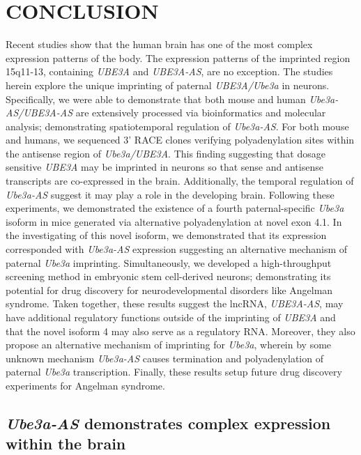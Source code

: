 
\chapter{\uppercase {Conclusion}}

Recent studies show that the human brain has one of the most complex expression patterns of the body. The expression patterns of the imprinted region 15q11-13, containing \textit{UBE3A} and \textit{UBE3A-AS}, are no exception. The studies herein explore the unique imprinting of paternal \textit{UBE3A/Ube3a} in neurons. Specifically, we were able to demonstrate that both mouse and human \textit{Ube3a-AS/UBE3A-AS} are extensively processed via bioinformatics and molecular analysis; demonstrating spatiotemporal regulation of \textit{Ube3a-AS}. For both mouse and humans, we sequenced 3' RACE clones verifying polyadenylation sites within the antisense region of \textit{Ube3a/UBE3A}. This finding suggesting that dosage sensitive \textit{UBE3A} may be imprinted in neurons so that sense and antisense transcripts are co-expressed in the brain. Additionally, the temporal regulation of \textit{Ube3a-AS} suggest it may play a role in the developing brain. Following these experiments, we demonstrated the existence of a fourth paternal-specific \textit{Ube3a} isoform in mice generated via alternative polyadenylation at novel exon 4.1. In the investigating of this novel isoform, we demonstrated that its expression corresponded with \textit{Ube3a-AS} expression suggesting an alternative mechanism of paternal \textit{Ube3a} imprinting. Simultaneously, we developed a high-throughput screening method in embryonic stem cell-derived neurons; demonstrating its potential for drug discovery for neurodevelopmental disorders like Angelman syndrome. Taken together, these results suggest the lncRNA, \textit{UBE3A-AS}, may have additional regulatory functions outside of the imprinting of \textit{UBE3A} and that the novel isoform 4 may also serve as a regulatory RNA. Moreover, they also propose an alternative mechanism of imprinting for \textit{Ube3a}, wherein by some unknown mechanism \textit{Ube3a-AS} causes termination and polyadenylation of paternal \textit{Ube3a} transcription. Finally, these results setup future drug discovery experiments for Angelman syndrome.

\section{\textit{Ube3a-AS} demonstrates complex expression within the brain}

